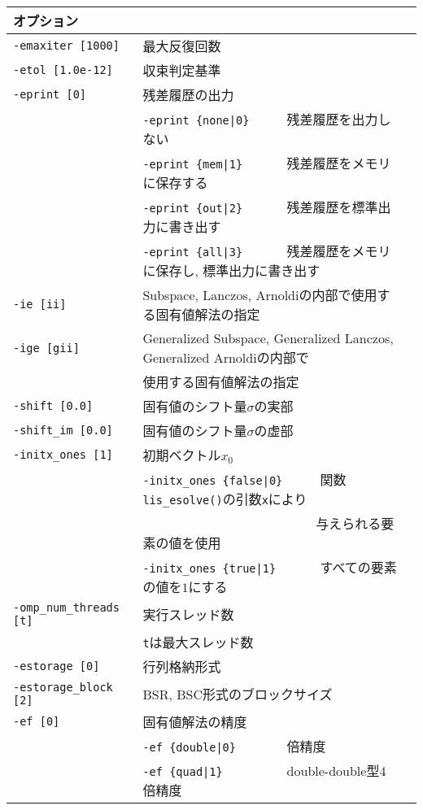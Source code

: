 \documentclass[a4paper]{jarticle}
\begin{document}
{{\begin{minipage}[t]{\textwidth}
\begin{center}
\begin{tabular}{l|ll}\hline\hline
オプション &                          \\ \hline
\verb=-emaxiter [1000]= & 最大反復回数         \\ 
\verb=-etol [1.0e-12]=  & 収束判定基準              \\
\verb=-eprint [0]=      & 残差履歴の出力                 \\
                       & \verb=-eprint {none|0}     =  残差履歴を出力しない \\
                       & \verb=-eprint {mem|1}      =  残差履歴をメモリに保存する\\
                       & \verb=-eprint {out|2}      =  残差履歴を標準出力に書き出す\\
                       & \verb=-eprint {all|3}      =  残差履歴をメモリに保存し, 標準出力に書き出す\\
\verb=-ie [ii]= & Subspace, Lanczos, Arnoldiの内部で使用する固有値解法の指定  \\
\verb=-ige [gii]= & Generalized Subspace, Generalized Lanczos, Generalized Arnoldiの内部で\\
                       & 使用する固有値解法の指定  \\
\verb=-shift [0.0]= & 固有値のシフト量$\sigma$の実部 \\
\verb=-shift_im [0.0]= & 固有値のシフト量$\sigma$の虚部 \\
\verb=-initx_ones [1]= & 初期ベクトル$x_{0}$  \\
                       & \verb=-initx_ones {false|0}     =  関数\verb=lis_esolve()=の引数\verb=x=により \\
                       & \verb=                          =  与えられる要素の値を使用 \\
                       & \verb=-initx_ones {true|1}      =  すべての要素の値を$1$にする\\
\verb=-omp_num_threads [t]= & 実行スレッド数         \\ 
                            & \verb=t=は最大スレッド数 \\
\verb=-estorage [0]=   & 行列格納形式 \\
\verb=-estorage_block [2]= & BSR, BSC形式のブロックサイズ \\ 
\verb=-ef [0]=         & 固有値解法の精度 \\
                       & \verb=-ef {double|0}       =   倍精度 \\
                       & \verb=-ef {quad|1}         =   double-double型4倍精度 \\
\hline         
\end{tabular}
\end{center}
\end{minipage}
\\ \\

}}
\end{document}
